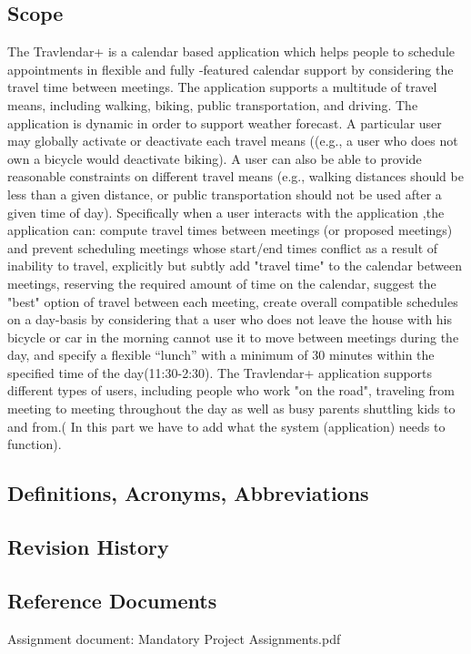 \documentclass[12pt]{article}
\begin{document}
\subsection{Scope}
The Travlendar+ is  a calendar based application which helps people to schedule appointments in flexible and fully -featured calendar support by considering the travel time between meetings. The application supports a multitude of travel means, including walking, biking, public transportation, and driving. The application is dynamic in order to support weather forecast. A particular user may globally activate or deactivate each travel means ((e.g., a user who does not own a bicycle would deactivate biking). A user can also be able to provide reasonable constraints on different travel means (e.g., walking distances should be less than a given distance, or public transportation should not be used after a given time of day). 
Specifically  when a user interacts with the application ,the application can: compute travel times between meetings (or proposed meetings) and prevent scheduling meetings whose start/end times conflict as a result of inability to travel, explicitly but subtly add "travel time" to the calendar between meetings, reserving the required amount of time on the calendar, suggest  the "best" option of travel between each meeting, create overall compatible schedules on a day-basis by considering that a user who does not leave the house with his bicycle or car in the morning cannot use it to move between meetings during the day, and specify a flexible “lunch” with a minimum of 30 minutes within the specified time of the day(11:30-2:30).
The Travlendar+ application supports different types of users, including people who work "on the road", traveling from meeting to meeting throughout the day as well as busy parents shuttling kids to and from.( In this part we have to add what the system (application) needs to function).

\subsection{Definitions, Acronyms, Abbreviations}

\subsection{Revision History}

\subsection{Reference Documents}
Assignment document: Mandatory Project Assignments.pdf
\end{document}
